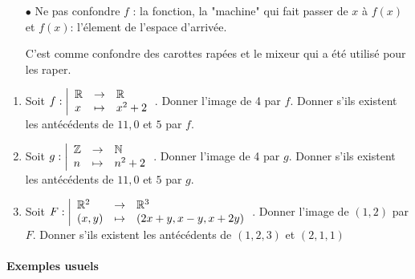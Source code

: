 \documentclass[a4paper, 11pt]{article}
\begin{document}
\begin{rems}
	\begin{itemize}
		\item[$\bullet$]  \warning  Ne pas confondre $f$ : la fonction, la "machine" qui fait passer de $x$ à $f(x)$
			\hspace*{2.8cm} et $f(x)$:  l'élement de l'espace d'arrivée.

			C'est comme confondre des carottes rapées et le mixeur qui a été utilisé pour les raper.

	\end{itemize}
\end{rems}


{\footnotesize
\begin{exercice}
	\begin{enumerate}
		\item Soit $f: \left| \begin{array}{lll} \mathbb{R} & \rightarrow & \mathbb{R}     \\
             x        & \mapsto     & x^2 +2\end{array} \right.$. Donner l'image de 4 par $f$. Donner s'ils existent les ant\'ec\'edents de $11, 0$ et $5$ par $f$.
		\item Soit $g: \left| \begin{array}{lll} \mathbb{Z} & \rightarrow & \mathbb{N}    \\
             n        & \mapsto     & n^2+2\end{array} \right.$. Donner l'image de 4 par $g$. Donner s'ils existent les ant\'ec\'edents de $11, 0$ et $5$ par $g$.

		\item Soit $F: \left| \begin{array}{lll} \mathbb{R}^2 & \rightarrow & \mathbb{R}^3            \\
             (x,y)      & \mapsto     & (2x+y,x-y,x+2y)\end{array} \right.$. Donner l'image de $(1,2)$ par $F$. Donner s'ils existent les ant\'ec\'edents de $(1,2,3)$ et $(2,1,1)$
	\end{enumerate}
\end{exercice}}


%

\paragraph{Exemples usuels}
\end{document}

